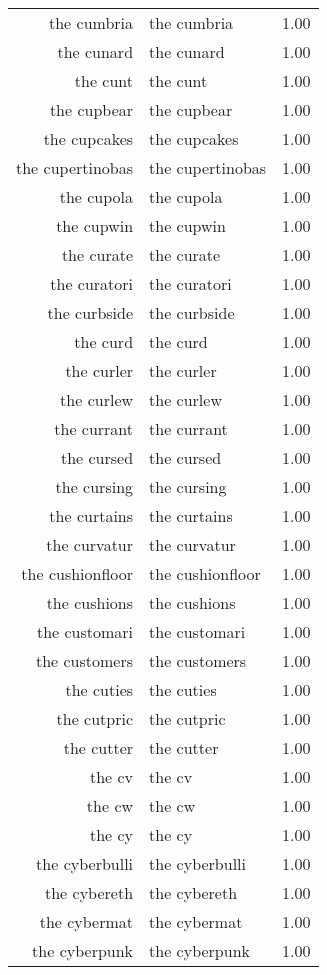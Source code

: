 \begin{table}[ht]
\begin{tabular}{rlr}
  the cumbria & the cumbria & 1.00 \\ 
  the cunard & the cunard & 1.00 \\ 
  the cunt & the cunt & 1.00 \\ 
  the cupbear & the cupbear & 1.00 \\ 
  the cupcakes & the cupcakes & 1.00 \\ 
  the cupertinobas & the cupertinobas & 1.00 \\ 
  the cupola & the cupola & 1.00 \\ 
  the cupwin & the cupwin & 1.00 \\ 
  the curate & the curate & 1.00 \\ 
  the curatori & the curatori & 1.00 \\ 
  the curbside & the curbside & 1.00 \\ 
  the curd & the curd & 1.00 \\ 
  the curler & the curler & 1.00 \\ 
  the curlew & the curlew & 1.00 \\ 
  the currant & the currant & 1.00 \\ 
  the cursed & the cursed & 1.00 \\ 
  the cursing & the cursing & 1.00 \\ 
  the curtains & the curtains & 1.00 \\ 
  the curvatur & the curvatur & 1.00 \\ 
  the cushionfloor & the cushionfloor & 1.00 \\ 
  the cushions & the cushions & 1.00 \\ 
  the customari & the customari & 1.00 \\ 
  the customers & the customers & 1.00 \\ 
  the cuties & the cuties & 1.00 \\ 
  the cutpric & the cutpric & 1.00 \\ 
  the cutter & the cutter & 1.00 \\ 
  the cv & the cv & 1.00 \\ 
  the cw & the cw & 1.00 \\ 
  the cy & the cy & 1.00 \\ 
  the cyberbulli & the cyberbulli & 1.00 \\ 
  the cybereth & the cybereth & 1.00 \\ 
  the cybermat & the cybermat & 1.00 \\ 
  the cyberpunk & the cyberpunk & 1.00 \\ 

\end{tabular}
\end{table}
